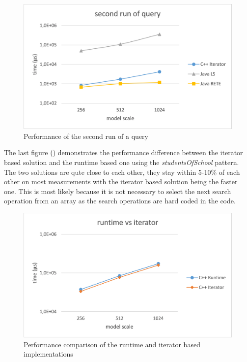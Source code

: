 \begin{figure}[!ht]
\centering
\includegraphics[width=120mm,
keepaspectratio]{figures/meas_second_run.png}
\caption{Performance of the second run of a query}
\label{fig:meas_second_run}
\end{figure}

The last figure () demonstrates the
performance difference between the iterator based solution and the runtime based
one using the \emph{studentsOfSchool} pattern. The two solutions are qute close
to each other, they stay within 5-10\% of each other on most measurements with
the iterator based solution being the faster one. This is most likely because
it is not necessary to select the next search operation from an array as the
search operations are hard coded in the code.


\begin{figure}[!ht]
\centering
\includegraphics[width=120mm,
keepaspectratio]{figures/meas_runtime_vs_iterator.png}
\caption{Performance comparison of the runtime and iterator based implementations}
\label{fig:meas_runtime_vs_iterator}
\end{figure}
